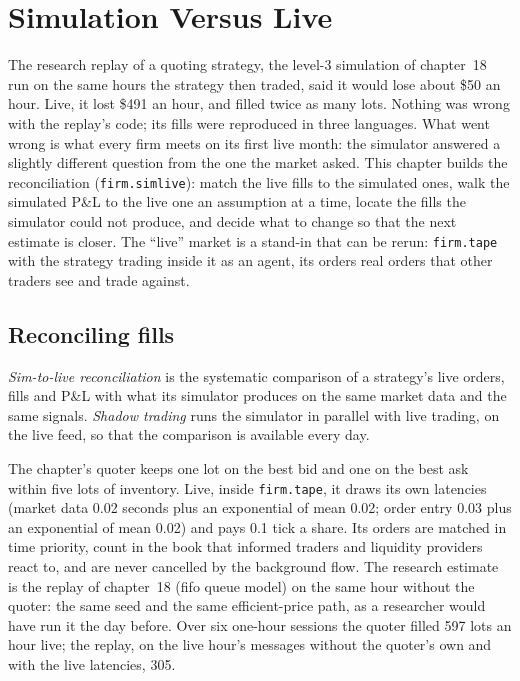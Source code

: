\chapter{Simulation Versus Live}\label{ch:rs:simulation-versus-live}

The research replay of a quoting strategy, the level-3 simulation of chapter~18 run on the same hours the strategy then traded, said it would lose
about \$50 an hour. Live, it lost \$491 an hour, and filled twice as many lots. Nothing was wrong with the replay's code; its fills were reproduced
in three languages. What went wrong is what every firm meets on its first live month: the simulator answered a slightly different question from the one
the market asked. This chapter builds the reconciliation (\texttt{firm.simlive}): match the live fills to the simulated ones, walk the simulated P\&L to
the live one an assumption at a time, locate the fills the simulator could not produce, and decide what to change so that the next estimate is closer. The
``live'' market is a stand-in that can be rerun: \texttt{firm.tape} with the strategy trading inside it as an agent, its orders real orders that other traders
see and trade against.

\section{Reconciling fills}

\begin{definition}\label{def:rs:simulation-versus-live:reconciliation}
\emph{Sim-to-live reconciliation} is the systematic comparison of a strategy's live orders, fills and P\&L with what its
simulator produces on the same market data and the same signals. \emph{Shadow trading} runs the simulator in parallel with live trading,
on the live feed, so that the comparison is available every day.
\end{definition}

The chapter's quoter keeps one lot on the best bid and one on the best ask within five lots of inventory. Live, inside \texttt{firm.tape}, it draws its own
latencies (market data 0.02 seconds plus an exponential of mean 0.02; order entry 0.03 plus an exponential of mean 0.02) and pays 0.1 tick a share. Its orders
are matched in time priority, count in the book that informed traders and liquidity providers react to, and are never cancelled by the background flow. The
research estimate is the replay of chapter~18 (fifo queue model) on the same hour without the quoter: the same seed and the same efficient-price path, as a
researcher would have run it the day before. Over six one-hour sessions the quoter filled 597 lots an hour live; the replay, on the live hour's messages without
the quoter's own and with the live latencies, 305.

